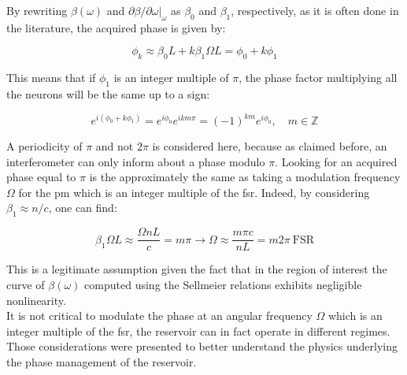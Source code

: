 By rewriting $\beta(\omega)$ and $\partial\beta/\partial\omega\rvert_\omega$ as $\beta_0$ and $\beta_1$, respectively, as it is often done in the literature, the acquired phase is given by:

\begin{equation}
	\phi_k \approx \beta_0 L + k \beta_1 \Omega L = \phi_0 + k \phi_1
\end{equation}

This means that if $\phi_1$ is an integer multiple of $\pi$, the phase factor multiplying all the neurons will be the same up to a sign:

\begin{equation}
	e^{i(\phi_0+k\phi_1)} = e^{i\phi_0}e^{ikm\pi} =(-1)^{km} e^{i\phi_0}, \quad m \in \mathbb{Z}
\end{equation}

A periodicity of $\pi$ and not $2\pi$ is considered here, because as claimed before, an interferometer can only inform about a phase modulo $\pi$. Looking for an acquired phase equal to $\pi$ is the approximately the same as taking a modulation frequency $\Omega$ for the \gls{pm} which is an integer multiple of the \gls{fsr}. Indeed, by considering $\beta_1 \approx n/c$, one can find:

\begin{equation}
	\beta_1 \Omega L \approx \frac{\Omega n L}{c} = m\pi \longrightarrow \Omega \approx \frac{m\pi c}{n L} = m2\pi ~\text{FSR}
\end{equation}

This is a legitimate assumption given the fact that in the region of interest the curve of $\beta(\omega)$ computed using the Sellmeier relations \cite{Bruckner,malitson1965interspecimen} exhibits negligible nonlinearity.\\

It is not critical to modulate the phase at an angular frequency $\Omega$ which is an integer multiple of the \gls{fsr}, the reservoir can in fact operate in different regimes. Those considerations were presented to better understand the physics underlying the phase management of the reservoir.\\

